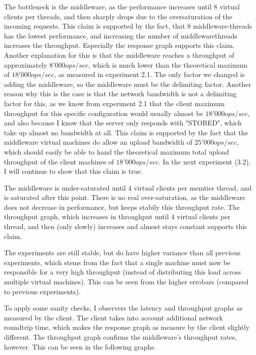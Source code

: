 \documentclass[11pt,a4paper]{article}
\begin{document}
The bottleneck is the middleware, as the performance increases until 8 virtual clients per threads, and then sharply drops due to the oversaturation of the incoming requests.
This claim is supported by the fact, that 8 middleware-threads has the lowest performance, and increasing the number of middlewarethreads increases the throughput.
Especially the response graph supports this claim.
Another explanation for this is that the middleware reaches a throughput of approximately $8'000 ops/sec$, which is much lower than the theoretical maximum of $18'000 ops/sec$, as measured in experiment 2.1.
The only factor we changed is adding the middleware, so the middleware must be the delimiting factor.
Another reason why this is the case is that the network bandwidth is not a delimiting factor for this, as we know from experiment 2.1 that the client maximum throughput for this specific configuration would usually almost be $18'000 ops/sec$, and also because I know that the server only responds with "STORED", which take up almost no bandwidth at all.
This claim is supported by the fact that the middleware virtual machines do allow an upload bandwidth of $25'000 ops / sec$, which should easily be able to hand the theoretical maximum total upload throughput of the client machines of $18'000 ops/sec$.
In the next experiment (3.2), I will continue to show that this claim is true.

The middleware is under-saturated until 4 virtual clients per memtier thread, and is saturated after this point.
There is no real over-saturation, as the middleware does not decrease in performance, but keeps stabily this throughput rate.
The throughput graph, which increases in throughput until 4 virtual clients per thread, and then (only slowly) increases and almost stays constant supports this claim.

The experiments are still stable, but do have higher variance than all previous experiments, which stems from the fact that a single machine must now be responsible for a very high throughput (instead of distributing this load across multiple virtual machines).
This can be seen from the higher errobars (compared to previous experiments).

To apply some sanity checks, I observers the latency and throughput graphs as measured by the client. 
The client takes into account additional network roundtrip time, which makes the response graph as measure by the client slightly different.
The throughput graph confirms the middleware's throughput rates, however.
This can be seen in the following graphs.
\end{document}
